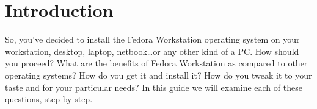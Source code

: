 \chapter*{Introduction}
So, you've decided to install the Fedora Workstation operating system on your workstation, desktop, laptop, netbook\dots or any other kind of a PC. How should you proceed? What are the benefits of Fedora Workstation as compared to other operating systems? How do you get it and install it? How do you tweak it to your taste and for your particular needs? In this guide we will examine each of these questions, step by step.

